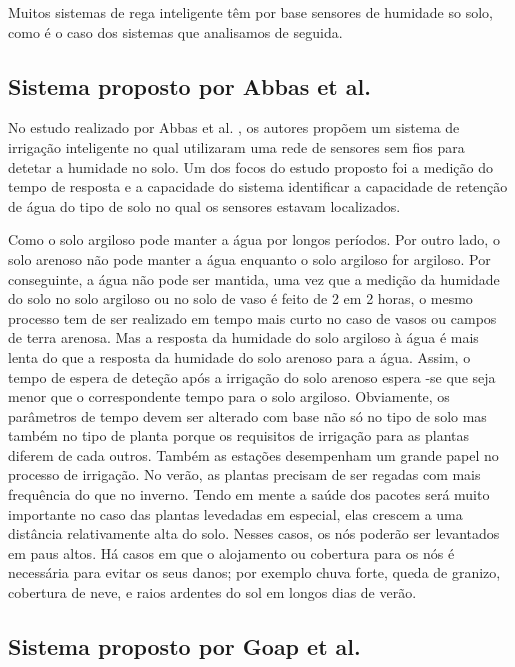 \documentclass[conference]{IEEEtran}
\begin{document}
Muitos sistemas de rega inteligente têm por base sensores de humidade so solo, como
é o caso dos sistemas que analisamos de seguida.

\subsection{Sistema proposto por Abbas et al.}

No estudo realizado por Abbas et al. \cite{abbas2014smart}, os autores propõem
um sistema de irrigação inteligente no qual utilizaram uma rede de sensores sem
fios para detetar a humidade no solo. Um dos focos do estudo proposto foi a medição
do tempo de resposta e a capacidade do sistema identificar a capacidade de
retenção de água do tipo de solo no qual os sensores estavam localizados.

Como o solo argiloso pode manter a água por longos períodos. Por outro lado,
o solo arenoso não pode manter a água enquanto o solo argiloso for argiloso.
Por conseguinte, a água não pode ser mantida, uma vez que a medição da
humidade do solo no solo argiloso ou no solo de vaso é feito de 2 em 2 horas,
o mesmo processo tem de ser realizado em tempo mais curto no caso de vasos
ou campos de terra arenosa. Mas a resposta da humidade do solo argiloso
à água é mais lenta do que a resposta da humidade do solo arenoso para a água.
Assim, o tempo de espera de deteção após a irrigação do solo
arenoso espera -se que seja menor que o correspondente tempo para o solo argiloso. Obviamente,
os parâmetros de tempo devem ser alterado com base não só no tipo de solo mas
também no tipo de planta porque os requisitos de irrigação para as plantas
diferem de cada outros. Também as estações desempenham um grande papel no
processo de irrigação. No verão, as plantas precisam de ser regadas com mais
frequência do que no inverno. Tendo em mente a saúde dos pacotes será muito
importante no caso das plantas levedadas em especial, elas crescem a uma
distância relativamente alta do solo. Nesses casos, os nós poderão ser
levantados em paus altos. Há casos em que o alojamento ou cobertura
para os nós é necessária para evitar os seus danos; por exemplo
chuva forte, queda de granizo, cobertura de neve, e raios ardentes
do sol em longos dias de verão. \cite{abbas2014smart}

\subsection{Sistema proposto por Goap et al.}
\end{document}
